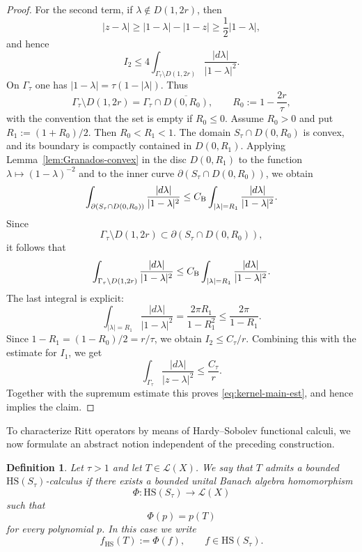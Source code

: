 \documentclass[11pt]{amsart}
\numberwithin{equation}{section}
\newtheorem{definition}[theorem]{Definition}
\theoremstyle{definition}
\theoremstyle{plain}
\def\L{L}
\newcommand{\HS}{\mathrm{HS}}
\renewcommand{\L}{\mathcal L}
\begin{document}
\begin{proof}
For the second term, if \(\lambda \not \in D(1,2r)\), then
\[
        |z-\lambda|\ge |1-\lambda|-|1-z|\ge \frac12|1-\lambda|,
\]
and hence
\[
        I_2
        \le
        4\int_{\Gamma_\tau\setminus D(1,2r)}
             \frac{|d\lambda|}{|1-\lambda|^2}.
\]
On \(\Gamma_\tau\) one has \(|1-\lambda|=\tau(1-|\lambda|)\).  Thus
\[
        \Gamma_\tau\setminus D(1,2r)
        =
        \Gamma_\tau\cap \overline{D(0,R_0)},
        \qquad
        R_0:=1-\frac{2r}{\tau},
\]
with the convention that the set is empty if \(R_0\le0\).  Assume \(R_0>0\)
and put \(R_1:=(1+R_0)/2\).  Then \(R_0<R_1<1\).  The domain
\(S_\tau\cap D(0,R_0)\) is convex, and its boundary is compactly contained in
\(D(0,R_1)\).  Applying Lemma~\ref{lem:Granados-convex} in the disc
\(D(0,R_1)\) to the function \(\lambda\mapsto(1-\lambda)^{-2}\) and to the inner curve
\(\partial(S_\tau\cap D(0,R_0))\), we obtain
\[
        \int_{\partial(S_\tau\cap D(0,R_0))}
             \frac{|d\lambda|}{|1-\lambda|^2}
        \le
        C_{\rm B}
        \int_{|\lambda|=R_1}
             \frac{|d\lambda|}{|1-\lambda|^2}.
\]
Since
\[
        \Gamma_\tau\setminus D(1,2r)
        \subset \partial(S_\tau\cap D(0,R_0)),
\]
it follows that
\[
        \int_{\Gamma_\tau\setminus D(1,2r)}
             \frac{|d\lambda|}{|1-\lambda|^2}
        \le
        C_{\rm B}
        \int_{|\lambda|=R_1}
             \frac{|d\lambda|}{|1-\lambda|^2}.
\]
The last integral is explicit:
\[
        \int_{|\lambda|=R_1}\frac{|d\lambda|}{|1-\lambda|^2}
        =
        \frac{2\pi R_1}{1-R_1^2}
        \le
        \frac{2\pi}{1-R_1}.
\]
Since \(1-R_1=(1-R_0)/2=r/\tau\), we obtain \(I_2\le C_\tau/r\).  Combining
this with the estimate for \(I_1\), we get
\[
        \int_{\Gamma_\tau}\frac{|d\lambda|}{|z-\lambda|^2}
        \le \frac{C_\tau}{r}.
\]
Together with the supremum estimate this proves \eqref{eq:kernel-main-est}, and hence implies the claim.
\end{proof}



To characterize Ritt operators by means of Hardy--Sobolev functional calculi, we now formulate an abstract notion independent of the preceding construction.

\begin{definition}\label{def:bounded-HS}
Let \(\tau>1\) and let \(T\in\L(X)\).  We say that \(T\) admits a bounded
\(\HS(S_\tau)\)-calculus if there exists a bounded unital Banach algebra
homomorphism
\[
        \Phi:\HS(S_\tau)\longrightarrow\L(X)
\]
such that
\begin{equation}\label{perm}
        \Phi(p)=p(T)
\end{equation}
for every polynomial \(p\).  In this case we write
\[
        f_{\HS}(T):=\Phi(f),\qquad f\in\HS(S_\tau).
\]
\end{definition}
\end{document}
